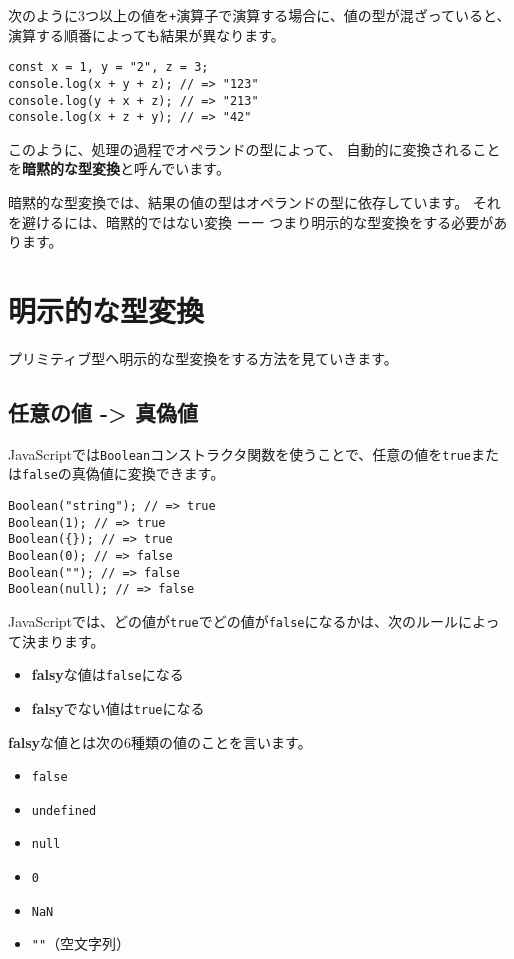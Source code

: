 次のように3つ以上の値を\texttt{+}演算子で演算する場合に、値の型が混ざっていると、
演算する順番によっても結果が異なります。

\begin{lstlisting}
const x = 1, y = "2", z = 3;
console.log(x + y + z); // => "123"
console.log(y + x + z); // => "213"
console.log(x + z + y); // => "42"
\end{lstlisting}

このように、処理の過程でオペランドの型によって、
自動的に変換されることを\textbf{暗黙的な型変換}と呼んでいます。

暗黙的な型変換では、結果の値の型はオペランドの型に依存しています。
それを避けるには、暗黙的ではない変換 ーー
つまり明示的な型変換をする必要があります。

\hypertarget{explicit-coercion}{%
\section{明示的な型変換}\label{explicit-coercion}}

プリミティブ型へ明示的な型変換をする方法を見ていきます。

\hypertarget{any-to-boolean}{%
\subsection{任意の値 -\textgreater{} 真偽値}\label{any-to-boolean}}

JavaScriptでは\texttt{Boolean}コンストラクタ関数を使うことで、任意の値を\texttt{true}または\texttt{false}の真偽値に変換できます。

\begin{lstlisting}
Boolean("string"); // => true
Boolean(1); // => true
Boolean({}); // => true
Boolean(0); // => false
Boolean(""); // => false
Boolean(null); // => false
\end{lstlisting}

JavaScriptでは、どの値が\texttt{true}でどの値が\texttt{false}になるかは、次のルールによって決まります。

\begin{itemize}
\item
  \textbf{falsy}な値は\texttt{false}になる
\item
  \textbf{falsy}でない値は\texttt{true}になる
\end{itemize}

\textbf{falsy}な値とは次の6種類の値のことを言います。

\begin{itemize}
\item
  \texttt{false}
\item
  \texttt{undefined}
\item
  \texttt{null}
\item
  \texttt{0}
\item
  \texttt{NaN}
\item
  \texttt{""}（空文字列）
\end{itemize}

